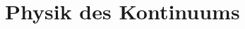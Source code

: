 %
\chapter{Physik des Kontinuums}\label{chap:kontmech}
\def\chapname{kontmech}


\clearpage

\clearpage

\clearpage

\renewcommand\glslongextraNameAlign{p{36mm}}
\renewcommand\glslongextraDescAlign{p{60mm}}
\clearpage
\bgroup
\small
\printunsrtglossary[type=kontmech]
\egroup
\clearpage
\fancyhead[RE]{\nouppercase\rightmark}

\clearpage
\fancyhead[RE]{\nouppercase\leftmark}
%
